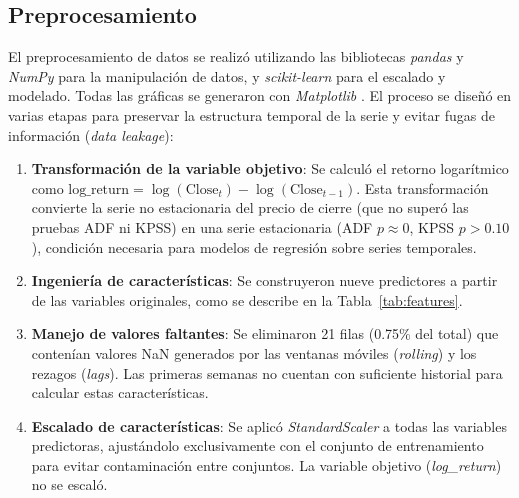 \documentclass[12pt,a4paper]{article}
\begin{document}
\subsection{Preprocesamiento}

El preprocesamiento de datos se realizó utilizando las bibliotecas \textit{pandas} \cite{mckinney2010pandas, pandas_docs} y \textit{NumPy} para la manipulación de datos, y \textit{scikit-learn} \cite{pedregosa2011scikit} para el escalado y modelado. Todas las gráficas se generaron con \textit{Matplotlib} \cite{matplotlib_docs}. El proceso se diseñó en varias etapas para preservar la estructura temporal de la serie y evitar fugas de información (\textit{data leakage}):

\begin{enumerate}[leftmargin=*,labelindent=0em]
    \item \textbf{Transformación de la variable objetivo}: Se calculó el retorno logarítmico como $\text{log\_return} = \log(\text{Close}_t) - \log(\text{Close}_{t-1})$. Esta transformación convierte la serie no estacionaria del precio de cierre (que no superó las pruebas ADF ni KPSS) en una serie estacionaria (ADF $p \approx 0$, KPSS $p > 0.10$), condición necesaria para modelos de regresión sobre series temporales.
    
    \item \textbf{Ingeniería de características}: Se construyeron nueve predictores a partir de las variables originales, como se describe en la Tabla~\ref{tab:features}.
    
    \item \textbf{Manejo de valores faltantes}: Se eliminaron 21 filas (0.75\% del total) que contenían valores NaN generados por las ventanas móviles (\textit{rolling}) y los rezagos (\textit{lags}). Las primeras semanas no cuentan con suficiente historial para calcular estas características.
    
    \item \textbf{Escalado de características}: Se aplicó \textit{StandardScaler} a todas las variables predictoras, ajustándolo exclusivamente con el conjunto de entrenamiento para evitar contaminación entre conjuntos. La variable objetivo (\textit{log\_return}) no se escaló.
\end{enumerate}
\end{document}
